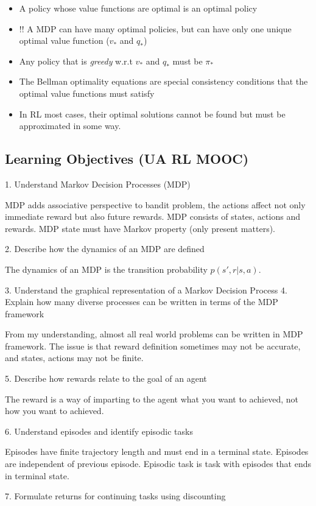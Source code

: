\documentclass[sutton_barto_notes.tex]{subfiles}
\begin{document}
\begin{itemize}
\item A policy whose value functions are optimal is an optimal policy
\item !! A MDP can have many optimal policies, but can have only one unique optimal value function ($v_*$ and $q_*$)
\item Any policy that is \textit{greedy} w.r.t $v_*$ and $q_*$ must be $\pi_*$
\item The Bellman optimality equations are special consistency conditions that the optimal value functions must satisfy
\item In RL most cases, their optimal solutions cannot be found but must be approximated in some way.
\end{itemize}

\newpage
\subsection{Learning Objectives (UA RL MOOC)}
1. Understand Markov Decision Processes (MDP)

MDP adds associative perspective to bandit problem, the actions affect not only immediate reward but also future rewards.
MDP consists of states, actions and rewards. MDP state must have Markov property (only present matters).

2. Describe how the dynamics of an MDP are defined

The dynamics of an MDP is the transition probability $p(s',r|s,a)$.

3. Understand the graphical representation of a Markov Decision Process
4. Explain how many diverse processes can be written in terms of the MDP framework

From my understanding, almost all real world problems can be written in MDP framework. The issue is that reward definition sometimes may not be accurate, and states, actions may not be finite.

5. Describe how rewards relate to the goal of an agent

The reward is a way of imparting to the agent what you want to achieved, not how you want to achieved.

6. Understand episodes and identify episodic tasks

Episodes have finite trajectory length and must end in a terminal state. Episodes are independent of previous episode.
Episodic task is task with episodes that ends in terminal state.

7. Formulate returns for continuing tasks using discounting
\end{document}
